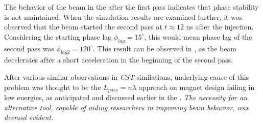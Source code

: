 \documentclass[a4paper,oneside,12pt]{report}
\numberwithin{equation}{chapter}
\begin{document}
The behavior of the beam in the  after the first pass indicates that phase stability is not maintained. 
When the simulation results are examined further, it was observed that the beam started the second pass at $t \approx 12$ ns after the injection. 
Considering the starting phase lag $\phi_{lag}=15^\circ$, this would mean phase lag of the second pass was $\phi_{lag2}=120^\circ$.
This result can be observed in , as the beam decelerates after a short acceleration in the beginning of the second pass.

After various similar observations in \textit{CST} similations, underlying cause of this problem was thought to be the $L_{pass} = n \lambda$ approach on magnet design failing in low energies, 
as anticipated and discussed earlier in the .
\emph{The necessity for an alternative tool, capable of aiding researchers in improving beam behavior, was deemed evident.}
\end{document}
